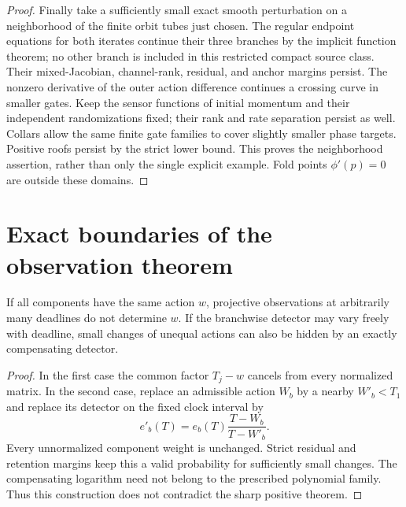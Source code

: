 \begin{proof}
Finally take a sufficiently small exact smooth perturbation on a
neighborhood of the finite orbit tubes just chosen. The regular
endpoint equations for both iterates continue their three branches by
the implicit function theorem; no other branch is included in this
restricted compact source class. Their mixed-Jacobian, channel-rank,
residual, and anchor margins persist. The nonzero derivative of the
outer action difference continues a crossing curve in smaller gates.
Keep the sensor functions of initial momentum and their independent
randomizations fixed; their rank and rate separation persist as well.
Collars allow the same finite gate families to cover slightly smaller
phase targets. Positive roofs persist by the strict lower bound.
This proves the neighborhood assertion, rather than only the single
explicit example. Fold points $\phi'(p)=0$ are outside these domains.
\end{proof}

\section{Exact boundaries of the observation theorem}
\label{sec:v83-boundaries}

\begin{proposition}
\label{prop:v83-obstructions}
If all components have the same action $w$, projective observations
at arbitrarily many deadlines do not determine $w$. If the branchwise
detector may vary freely with deadline, small changes of unequal
actions can also be hidden by an exactly compensating detector.
\end{proposition}
\begin{proof}
In the first case the common factor $T_j-w$ cancels from every
normalized matrix. In the second case, replace an admissible action
$W_b$ by a nearby $W'_b<T_1$ and replace its detector on the fixed
clock interval by
\[
             e'_b(T)=e_b(T)\frac{T-W_b}{T-W'_b}.
\]
Every unnormalized component weight is unchanged. Strict residual and
retention margins keep this a valid probability for sufficiently small
changes. The compensating logarithm need not belong to the prescribed
polynomial family. Thus this construction does not contradict the sharp
positive theorem.
\end{proof}

